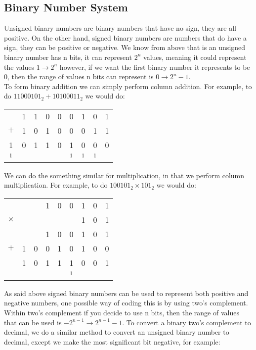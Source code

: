 \subsection{Binary Number System}
  \noindent
  Unsigned binary numbers are binary numbers that have no sign, they are all positive. On the other hand, signed binary numbers are numbers that do have a sign, they can be positive or negative. We know from above that is an unsigned binary number has n bits, it can represent $2^n$ values, meaning it could represent the values $1 \to 2^n$ however, if we want the first binary number it represents to be 0, then the range of values n bits can represent is $0 \to 2^n-1$.\\
  To form binary addition we can simply perform column addition. For example, to do $11000101_2 + 10100011_2$ we would do:
  \begin{table}[H]
    \begin{tabular}{ c@{\,} c@{\,} c@{\,} c@{\,} c@{\,} c@{\,} c@{\,} c@{\,} c@{\,} }
      & 1 & 1 & 0 & 0 & 0 & 1 & 0 & 1 \\
      $+$& 1 & 0 & 1 & 0 & 0 & 0 & 1 & 1 \\ \hline
      1 & 0 & 1 & 1 & 0 & 1 & 0 & 0 & 0 \\ \hline
      $^1$&   &   &   &   &$^1$&$^1$&$^1$&
    \end{tabular}
  \end{table}
  We can do the something similar for multiplication, in that we perform column multiplication. For example, to do $100101_2 \times 101_2$ we would do:
  \begin{table}[H]
    \begin{tabular}{ c@{\,} c@{\,} c@{\,} c@{\,} c@{\,} c@{\,} c@{\,} c@{\,} c@{\,} }
        &     &     &  1  &  0  &  0  &  1  &  0  &  1  \\
      $\times$&     &     &     &     &     &  1  &  0  &  1  \\ \hline
        &     &     &  1  &  0  &  0  &  1  &  0  &  1  \\
      $  +   $&  1  &  0  &  0  &  1  &  0  &  1  &  0  &  0  \\ \hline
        &  1  &  0  &  1  &  1  &  1  &  0  &  0  &  1  \\ \hline
        &     &     &     &     &$^1$ &     &     &     \\
    \end{tabular}
  \end{table}
  \noindent
  As said above signed binary numbers can be used to represent both positive and negative numbers, one possible way of coding this is by using two's complement. Within two's complement if you decide to use n bits, then the range of values that can be used is $-2^{n-1} \to 2^{n-1}-1$. To convert a binary two's complement to decimal, we do a similar method to convert an unsigned binary number to decimal, except we make the most significant bit negative, for example:
